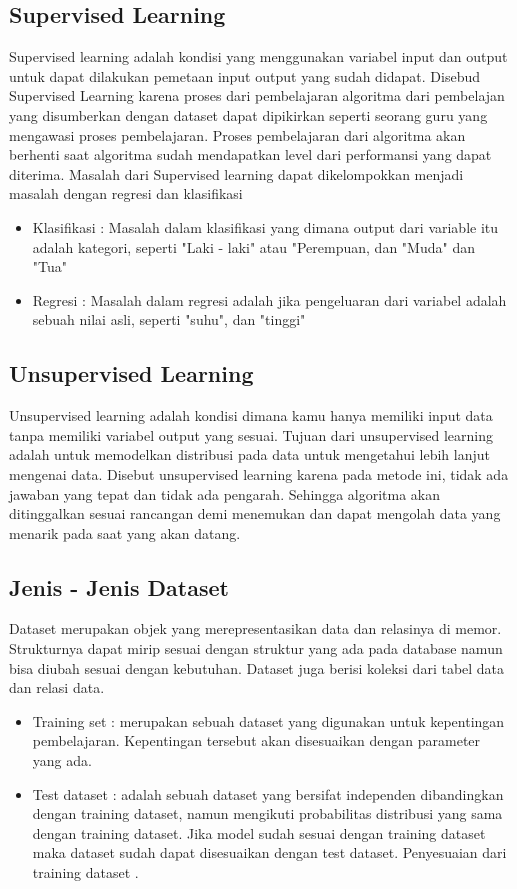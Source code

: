 \subsection{Supervised Learning}
Supervised learning adalah kondisi yang menggunakan variabel input dan output untuk dapat dilakukan pemetaan input output yang sudah didapat. Disebud Supervised Learning karena proses dari pembelajaran algoritma dari pembelajan yang disumberkan dengan dataset dapat dipikirkan seperti seorang guru yang mengawasi proses pembelajaran. Proses pembelajaran dari algoritma akan berhenti saat algoritma sudah mendapatkan level dari performansi yang dapat diterima.
\hfill\break
Masalah dari Supervised learning dapat dikelompokkan menjadi masalah dengan regresi dan klasifikasi
\begin{itemize}
	\item Klasifikasi : Masalah dalam klasifikasi yang dimana output dari variable itu adalah kategori, seperti "Laki - laki" atau "Perempuan, dan "Muda" dan "Tua"
	\item Regresi : Masalah dalam regresi adalah jika pengeluaran dari variabel adalah sebuah nilai asli, seperti "suhu", dan "tinggi"
\end{itemize}

\subsection{Unsupervised Learning}
Unsupervised learning adalah kondisi dimana kamu hanya memiliki input data tanpa memiliki variabel output yang sesuai. Tujuan dari unsupervised learning adalah untuk memodelkan distribusi pada data untuk mengetahui lebih lanjut mengenai data. Disebut unsupervised learning karena pada metode ini, tidak ada jawaban yang tepat dan tidak ada pengarah. Sehingga algoritma akan ditinggalkan sesuai rancangan demi menemukan dan dapat mengolah data yang menarik pada saat yang akan datang. 

\subsection{Jenis - Jenis Dataset}
Dataset merupakan objek yang merepresentasikan data dan relasinya di memor. Strukturnya dapat mirip sesuai dengan struktur yang ada pada database namun bisa diubah sesuai dengan kebutuhan. Dataset juga berisi koleksi dari tabel data dan relasi data.
\begin{itemize}
	\item Training set : merupakan sebuah dataset yang digunakan untuk kepentingan pembelajaran. Kepentingan tersebut akan disesuaikan dengan parameter yang ada. 
	\item Test dataset : adalah sebuah dataset yang bersifat independen dibandingkan dengan training dataset, namun mengikuti probabilitas distribusi yang sama dengan training dataset. Jika model sudah sesuai dengan training dataset maka dataset sudah dapat disesuaikan dengan test dataset. Penyesuaian dari training dataset .
\end{itemize}

